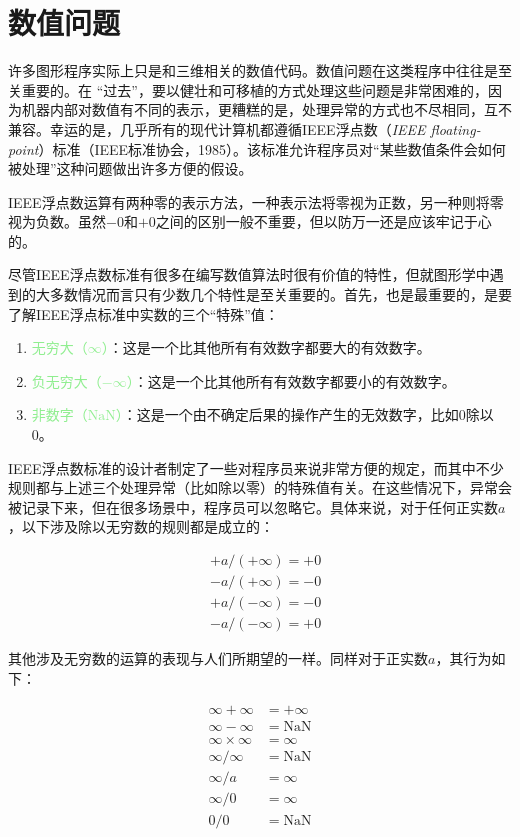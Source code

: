 \documentclass[lang=cn,12pt]{elegantbook}
\begin{document}
\section{数值问题}

许多图形程序实际上只是和三维相关的数值代码。数值问题在这类程序中往往是至关重要的。在 “过去”，要以健壮和可移植的方式处理这些问题是非常困难的，因为机器内部对数值有不同的表示，更糟糕的是，处理异常的方式也不尽相同，互不兼容。幸运的是，几乎所有的现代计算机都遵循IEEE浮点数（\textit{IEEE floating-point}）标准（IEEE标准协会，1985）。该标准允许程序员对“某些数值条件会如何被处理”这种问题做出许多方便的假设。

\begin{note}
  IEEE浮点数运算有两种零的表示方法，一种表示法将零视为正数，另一种则将零视为负数。虽然$-0$和$+0$之间的区别一般不重要，但以防万一还是应该牢记于心的。
\end{note}

尽管IEEE浮点数标准有很多在编写数值算法时很有价值的特性，但就图形学中遇到的大多数情况而言只有少数几个特性是至关重要的。首先，也是最重要的，是要了解IEEE浮点标准中实数的三个“特殊”值：


\begin{enumerate}
  \item \textcolor{lightgreen}{无穷大（$\infty$）}：这是一个比其他所有有效数字都要大的有效数字。
  \item \textcolor{lightgreen}{负无穷大（$-\infty$）}：这是一个比其他所有有效数字都要小的有效数字。
  \item \textcolor{lightgreen}{非数字（$\mathrm{NaN}$）}：这是一个由不确定后果的操作产生的无效数字，比如0除以0。
\end{enumerate}

IEEE浮点数标准的设计者制定了一些对程序员来说非常方便的规定，而其中不少规则都与上述三个处理异常（比如除以零）的特殊值有关。在这些情况下，异常会被记录下来，但在很多场景中，程序员可以忽略它。具体来说，对于任何正实数$a$，以下涉及除以无穷数的规则都是成立的：

\[
  \begin{aligned}
     & +a /(+\infty)=+0 \\
     & -a /(+\infty)=-0 \\
     & +a /(-\infty)=-0 \\
     & -a /(-\infty)=+0
  \end{aligned}
\]

其他涉及无穷数的运算的表现与人们所期望的一样。同样对于正实数$a$，其行为如下：

\[
  \begin{aligned}
    \infty+\infty        & =+\infty      \\
    \infty-\infty        & =\mathrm{NaN} \\
    \infty \times \infty & =\infty       \\
    \infty / \infty      & =\mathrm{NaN} \\
    \infty / a           & =\infty       \\
    \infty / 0           & =\infty       \\
    0 / 0                & =\mathrm{NaN}
  \end{aligned}
\]
\end{document}
